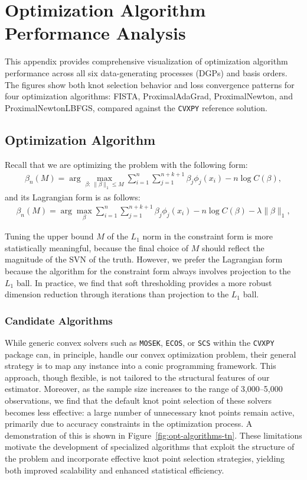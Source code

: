 
\section{Optimization Algorithm Performance Analysis} \label{app:knot-selection}

This appendix provides comprehensive visualization of optimization algorithm performance across all six data-generating processes (DGPs) and basis orders. The figures show both knot selection behavior and loss convergence patterns for four optimization algorithms: FISTA, ProximalAdaGrad, ProximalNewton, and ProximalNewtonLBFGS, compared against the \texttt{CVXPY} reference solution.

\subsection{Optimization Algorithm} \label{sct: opt_alg}
Recall that we are optimizing the problem with the following form:
\begin{align}\label{constraint opt}
   \beta_n(M) = \arg\max_{\beta:\ \|\beta\|_1 \leq M} \sum_{i=1}^{n} \sum_{j=1}^{n+k+1} \beta_j \phi_j(x_i) - n\log C(\beta), 
\end{align} 
and its Lagrangian form is as follows:
\begin{align} \label{lag opt}
   \beta_n(M) = \arg\max_{\beta} \sum_{i=1}^{n} \sum_{j=1}^{n+k+1} \beta_j \phi_j(x_i) - n\log C(\beta) - \lambda \|\beta\|_1, 
\end{align} 

Tuning the upper bound $M$ of the $L_1$ norm in the constraint form is more statistically meaningful, because the final choice of $M$ should reflect the magnitude of the SVN of the truth. However, we prefer the Lagrangian form because the algorithm for the constraint form always involves projection to the $L_1$ ball. In practice, we find that soft thresholding provides a more robust dimension reduction through iterations than projection to the $L_1$ ball.

\subsubsection{Candidate Algorithms} \label{subsct: cand_alg}
While generic convex solvers such as \texttt{MOSEK}, \texttt{ECOS}, or \texttt{SCS} within the \texttt{CVXPY} package can, in principle, handle our convex optimization problem, their general strategy is to map any instance into a conic programming framework. This approach, though flexible, is not tailored to the structural features of our estimator. Moreover, as the sample size increases to the range of 3,000--5,000 observations, we find that the default knot point selection of these solvers becomes less effective: a large number of unnecessary knot points remain active, primarily due to accuracy constraints in the optimization process. A demonstration of this is shown in Figure~\ref{fig:opt-algorithms-tn}. These limitations motivate the development of specialized algorithms that exploit the structure of the problem and incorporate effective knot point selection strategies, yielding both improved scalability and enhanced statistical efficiency. 

